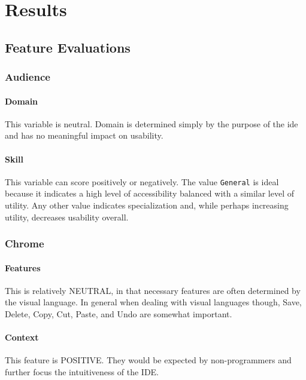 \section{Results}
\label{sec:results}



\subsection{Feature Evaluations}
\label{sec:feature_evaluations}

\subsubsection{Audience}

\paragraph{Domain} This variable is neutral. Domain is determined simply by
the purpose of the \ac{ide} and has no meaningful impact on usability.

\paragraph{Skill} This variable can score positively or negatively. The
value \texttt{General} is ideal because it indicates a high level of
accessibility balanced with a similar level of utility. Any other value
indicates specialization and, while perhaps increasing utility, decreases
usability overall.


\subsubsection{Chrome}

\paragraph{Features} This is relatively NEUTRAL, in that necessary features
are often determined by the visual language. In general when dealing with
visual languages though, Save, Delete, Copy, Cut, Paste, and Undo are
somewhat important.

\paragraph{Context} This feature is POSITIVE. They would be expected by
non-programmers and further focus the intuitiveness of the IDE.

